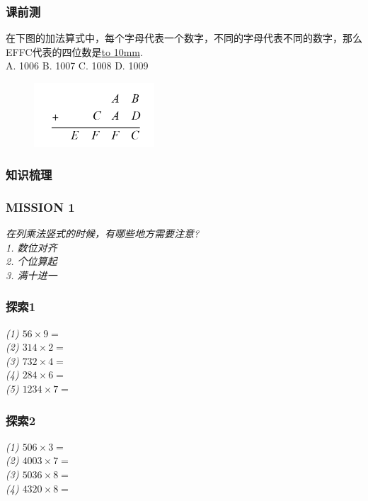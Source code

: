 \begin{frame}
    \frametitle{课前测}
    \parbox{0.9\textwidth}{在下图的加法算式中，每个字母代表一个数字，不同的字母代表不同的数字，那么EFFC代表的四位数是\underline{\hbox to 10mm{}}.\\
    A. 1006\qquad 
    B. 1007\qquad 
    C. 1008\qquad
    D. 1009}
    \begin{figure}[H] 
        \centering
        \includegraphics[width=0.4\textwidth]{./pics/Chapter_4/keqian3.png}
    \end{figure}
\end{frame}

\begin{frame}
    \frametitle{知识梳理}
\end{frame}

\begin{frame}
    \frametitle{MISSION 1}
    \vspace*{-2cm}
    \textit{在列乘法竖式的时候，有哪些地方需要注意?\\}
    \textit{1. 数位对齐\\
        2. 个位算起\\
        3. 满十进一}
\end{frame}

\begin{frame}
    \frametitle{探索1}
    \vspace*{-2cm}
    \textit{(1) $56\times 9 = $\\
        (2) $314\times 2 = $\\
        (3) $732\times 4 = $\\
        (4) $284\times 6 = $\\
        (5) $1234\times 7 = $\\}
\end{frame}

\begin{frame}
    \frametitle{探索2}
    \vspace*{-2cm}
    \textit{(1) $506\times 3 = $\\
        (2) $4003\times 7 = $\\
        (3) $5036\times 8 = $\\
        (4) $4320\times 8 = $}
\end{frame}

